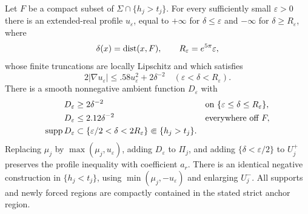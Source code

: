 \begin{lemma}\label{local:shell}
Let $F$ be a compact subset of $\Sigma\cap\{h_j>t_j\}$.
For every sufficiently small $\varepsilon>0$ there is an extended-real
profile $u_\varepsilon$, equal to $+\infty$ for $\delta\le\varepsilon$
and $-\infty$ for $\delta\ge R_\varepsilon$, where
\[
 \delta(x)=\operatorname{dist}(x,F),\qquad R_\varepsilon=e^{5\pi}\varepsilon,
\]
whose finite truncations are locally Lipschitz and which satisfies
\begin{equation}\label{local:shell-gradient}
 2|\nabla u_\varepsilon|
       \le .58u_\varepsilon^2+2\delta^{-2}
       \quad (\varepsilon<\delta<R_\varepsilon).
\end{equation}
There is a smooth nonnegative ambient function $D_\varepsilon$ with
\begin{equation}\label{local:shell-potential}
 \begin{aligned}
 D_\varepsilon&\ge2\delta^{-2}
       &&\text{on }\{\varepsilon\le\delta\le R_\varepsilon\},\\
 D_\varepsilon&\le2.12\delta^{-2}
       &&\text{everywhere off }F,\\
 \operatorname{supp} D_\varepsilon&\subset
       \{\varepsilon/2<\delta<2R_\varepsilon\}
       \Subset\{h_j>t_j\}.
 \end{aligned}
\end{equation}
Replacing $\mu_j$ by $\max(\mu_j,u_\varepsilon)$, adding
$D_\varepsilon$ to $\Pi_j$, and adding
$\{\delta<\varepsilon/2\}$ to $U_j^+$ preserves the profile inequality
with coefficient $a_r$.  There is an identical negative construction
in $\{h_j<t_j\}$, using $\min(\mu_j,-u_\varepsilon)$ and enlarging
$U_j^-$.  All supports and newly forced regions are compactly
contained in the stated strict anchor region.
\end{lemma}
